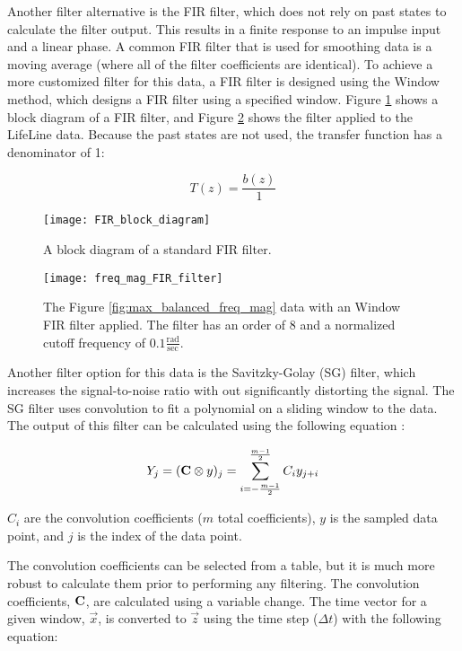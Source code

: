 Another filter alternative is the FIR filter, which does not rely on past states to calculate the filter output.  This results in a finite response to an impulse input and a linear phase.  A common FIR filter that is used for smoothing data is a moving average (where all of the filter coefficients are identical).  To achieve a more customized filter for this data, a FIR filter is designed using the Window method, which designs a FIR filter using a specified window.  Figure \ref{fig:FIR_block_diagram} shows a block diagram of a FIR filter, and Figure \ref{fig:freq_mag_FIR_filter} shows the filter applied to the LifeLine data.  Because the past states are not used, the transfer function has a denominator of 1:

\begin{equation}
	T(z) = \frac{b(z)}{1}
\end{equation}

\begin{figure}
	\centering
	\texttt{[image: FIR\_block\_diagram]}
	\decoRule
	\caption{A block diagram of a standard FIR filter. \cite{wiki:FIR_block_diagram}}
	\label{fig:FIR_block_diagram}
\end{figure}

\begin{figure}
	\centering
	\texttt{[image: freq\_mag\_FIR\_filter]}
	\decoRule
	\caption{The Figure \ref{fig:max_balanced_freq_mag} data with an Window FIR filter applied.  The filter has an order of 8 and a normalized cutoff frequency of $0.1 \mathrm{\frac{rad}{sec}}$.}
	\label{fig:freq_mag_FIR_filter}
\end{figure}

Another filter option for this data is the Savitzky-Golay (SG) filter, which increases the signal-to-noise ratio with out significantly distorting the signal.  The SG filter uses convolution to fit a polynomial on a sliding window to the data.  The output of this filter can be calculated using the following equation \cite{SG_filter}:

\begin{equation} \label{eq:SG_filter}
	Y_j = (\mathbf{C} \otimes y)_j = \sum_{i=-\frac{m-1}{2}}^{\frac{m-1}{2}} C_iy_{j+i}
\end{equation}

$C_i$ are the convolution coefficients ($m$ total coefficients), $y$ is the sampled data point, and $j$ is the index of the data point. 

The convolution coefficients can be selected from a table, but it is much more robust to calculate them prior to performing any filtering.  The convolution coefficients, $\mathbf{C}$, are calculated using a variable change.  The time vector for a given window, $\vec{x}$, is converted to $\vec{z}$ using the time step ($\Delta t$) with the following equation:

